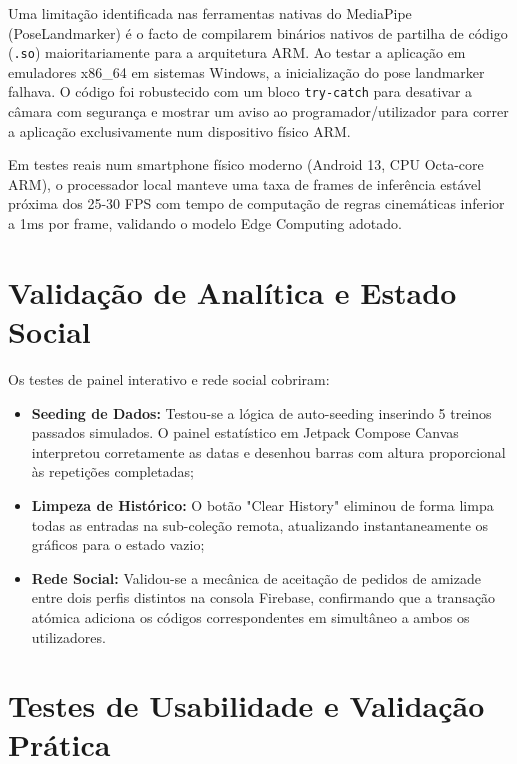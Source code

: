 Uma limitação identificada nas ferramentas nativas do MediaPipe (PoseLandmarker) é o facto de compilarem binários nativos de partilha de código (\texttt{.so}) maioritariamente para a arquitetura ARM. 
Ao testar a aplicação em emuladores x86\_64 em sistemas Windows, a inicialização do pose landmarker falhava. O código foi robustecido com um bloco \texttt{try-catch} para desativar a câmara com segurança e mostrar um aviso ao programador/utilizador para correr a aplicação exclusivamente num dispositivo físico ARM. 

Em testes reais num smartphone físico moderno (Android 13, CPU Octa-core ARM), o processador local manteve uma taxa de frames de inferência estável próxima dos 25-30 FPS com tempo de computação de regras cinemáticas inferior a 1ms por frame, validando o modelo Edge Computing adotado.


\section{Validação de Analítica e Estado Social}
\label{sec:testesAnalitica}

Os testes de painel interativo e rede social cobriram:
\begin{itemize}
    \item \textbf{Seeding de Dados:} Testou-se a lógica de auto-seeding inserindo 5 treinos passados simulados. O painel estatístico em Jetpack Compose Canvas interpretou corretamente as datas e desenhou barras com altura proporcional às repetições completadas;
    \item \textbf{Limpeza de Histórico:} O botão "Clear History" eliminou de forma limpa todas as entradas na sub-coleção remota, atualizando instantaneamente os gráficos para o estado vazio;
    \item \textbf{Rede Social:} Validou-se a mecânica de aceitação de pedidos de amizade entre dois perfis distintos na consola Firebase, confirmando que a transação atómica adiciona os códigos correspondentes em simultâneo a ambos os utilizadores.
\end{itemize}


\section{Testes de Usabilidade e Validação Prática}
\label{sec:testesUsabilidade}

